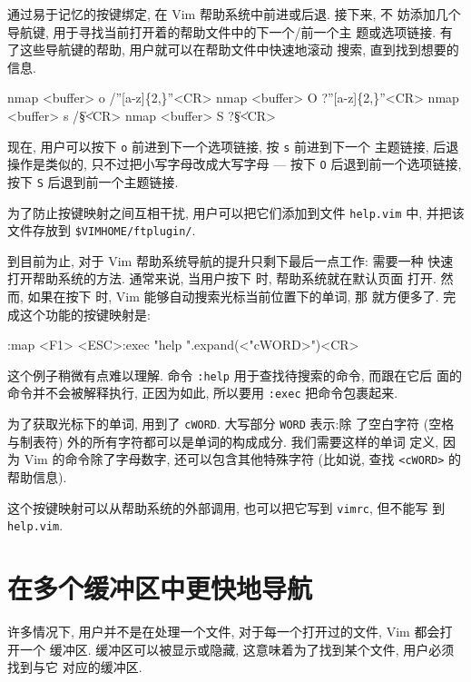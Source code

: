 通过易于记忆的按键绑定, 在 Vim 帮助系统中前进或后退. 接下来, 不
妨添加几个导航键, 用于寻找当前打开着的帮助文件中的下一个/前一个主
题或选项链接. 有了这些导航键的帮助, 用户就可以在帮助文件中快速地滚动
搜索, 直到找到想要的信息.
\begin{vimcode}
nmap <buffer> o /''[a-z]\{2,\}''<CR>
nmap <buffer> O ?''[a-z]\{2,\}''<CR>
nmap <buffer> s /\|\S\+\|<CR>
nmap <buffer> S ?\|\S\+\|<CR>
\end{vimcode}

现在, 用户可以按下 \texttt{o} 前进到下一个选项链接, 按 \texttt{s} 前进到下一个
主题链接, 后退操作是类似的, 只不过把小写字母改成大写字母 --- 按下 \texttt{O}
后退到前一个选项链接, 按下 \texttt{S} 后退到前一个主题链接.

\begin{warning}
    为了防止按键映射之间互相干扰, 用户可以把它们添加到文件 \texttt{help.vim} 中,
    并把该文件存放到 \verb'$VIMHOME/ftplugin/'.
\end{warning}

到目前为止, 对于 Vim 帮助系统导航的提升只剩下最后一点工作: 需要一种
快速打开帮助系统的方法. 通常来说, 当用户按下  时, 帮助系统就在默认页面
打开. 然而, 如果在按下  时, Vim 能够自动搜索光标当前位置下的单词, 那
就方便多了. 完成这个功能的按键映射是:
\begin{vimcode}
:map <F1> <ESC>:exec "help ".expand(<"cWORD>")<CR>
\end{vimcode}
这个例子稍微有点难以理解. 命令 \texttt{:help} 用于查找待搜索的命令, 而跟在它后
面的命令并不会被解释执行, 正因为如此, 所以要用 \texttt{:exec} 把命令包裹起来.

为了获取光标下的单词, 用到了 \texttt{cWORD}. 大写部分 \texttt{WORD} 表示:除
了空白字符 (空格与制表符) 外的所有字符都可以是单词的构成成分. 我们需要这样的单词
定义, 因为 Vim 的命令除了字母数字, 还可以包含其他特殊字符 (比如说, 查找
\texttt{<cWORD>} 的帮助信息).

这个按键映射可以从帮助系统的外部调用, 也可以把它写到 \texttt{vimrc}, 但不能写
到 \texttt{help.vim}.

\section{在多个缓冲区中更快地导航}
\label{sec:faster_navigation_in_multiple_buffers}

许多情况下, 用户并不是在处理一个文件, 对于每一个打开过的文件, Vim 都会打开一个
缓冲区. 缓冲区可以被显示或隐藏, 这意味着为了找到某个文件, 用户必须找到与它
对应的缓冲区.

